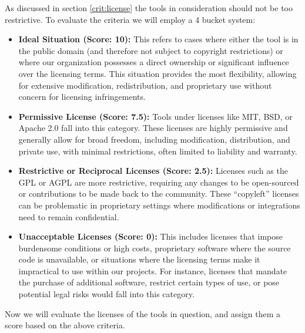 
As discussed in section \ref{crit:license} the tools in consideration should not be too restrictive.
To evaluate the criteria we will employ a 4 bucket system: 
\begin{itemize}
    \item \textbf{Ideal Situation (Score: 10):} 
    This refers to cases where either the tool is in the public domain (and therefore not subject to copyright restrictions) or where our organization possesses a direct ownership or significant influence over the licensing terms.
    This situation provides the most flexibility, allowing for extensive modification, redistribution, and proprietary use without concern for licensing infringements.


    \item \textbf{Permissive License (Score: 7.5):}
    Tools under licenses like MIT, BSD, or Apache 2.0 fall into this category.
    These licenses are highly permissive and generally allow for broad freedom, including modification, distribution, and private use, with minimal restrictions, often limited to liability and warranty.

    \item \textbf{Restrictive or Reciprocal Licenses (Score: 2.5):}
    Licenses such as the GPL or AGPL are more restrictive, requiring any changes to be open-sourced or contributions to be made back to the community.
    These “copyleft” licenses can be problematic in proprietary settings where modifications or integrations need to remain confidential.

    \item \textbf{Unacceptable Licenses (Score: 0):}
    This includes licenses that impose burdensome conditions or high costs, proprietary software where the source code is unavailable, or situations where the licensing terms make it impractical to use within our projects.
    For instance, licenses that mandate the purchase of additional software, restrict certain types of use, or pose potential legal risks would fall into this category.
\end{itemize}

Now we will evaluate the licenses of the tools in question, and assign them a score based on the above criteria.

